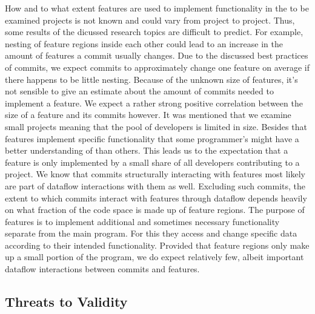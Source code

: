 How and to what extent features are used to implement functionality in the to be examined projects is not known and could vary from project to project.
Thus, some results of the dicussed research topics are difficult to predict.
For example, nesting of feature regions inside each other could lead to an increase in the amount of features a commit usually changes.
Due to the discussed best practices of commits, we expect commits to approximately change one feature on average if there happens to be little nesting.
Because of the unknown size of features, it's not sensible to give an estimate about the amount of commits needed to implement a feature.
We expect a rather strong positive correlation between the size of a feature and its commits however.
It was mentioned that we examine small projects meaning that the pool of developers is limited in size. 
Besides that features implement specific functionality that some programmer's might have a better understanding of than others.
This leads us to the expectation that a feature is only implemented by a small share of all developers contributing to a project.
We know that commits structurally interacting with features most likely are part of dataflow interactions with them as well.
Excluding such commits, the extent to which commits interact with features through dataflow depends heavily on what fraction of the code space is made up of feature regions.
The purpose of features is to implement additional and sometimes necessary functionality separate from the main program.
For this they access and change specific data according to their intended functionality.
Provided that feature regions only make up a small portion of the program, we do expect relatively few, albeit important dataflow interactions between commits and features.

\subsection{Threats to Validity}\label{sec:threats}

